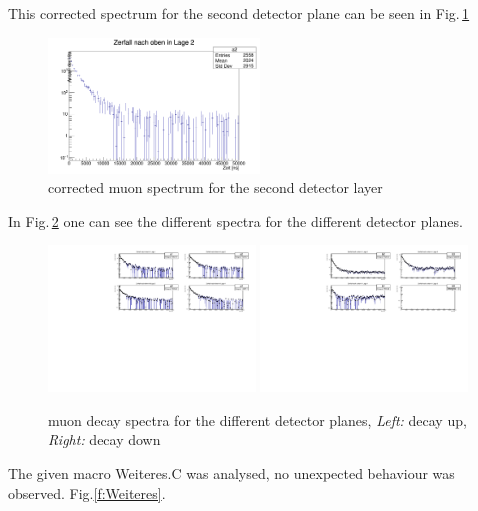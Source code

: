This corrected spectrum for the second detector plane can be seen in Fig.\,\ref{f:CorrectedMuons_new}

\begin{figure}[H]
\centering
\includegraphics[width=0.5\textwidth]{figures/CorrectedMuons_new.png}
\caption{corrected muon spectrum for the second detector layer}
\label{f:CorrectedMuons_new}
\end{figure}


In Fig.\,\ref{f:lebensdauer_plots} one can see the different spectra for the different detector planes. 

\begin{figure}[H]
    \centering
    \includegraphics[width=0.49\textwidth, trim={0 130pt 0 0}]{figures/Lebensdauer_up.pdf}
    \includegraphics[width=0.49\textwidth,trim={0 130pt 0 0}]{figures/Lebensdauer_down.pdf}
    \caption{muon decay spectra for the different detector planes, \emph{Left:} decay up, \emph{Right:} decay down}
    \label{f:lebensdauer_plots}
\end{figure}


The given macro Weiteres.C was analysed, no unexpected behaviour was observed. Fig.\ref{f:Weiteres}. %

